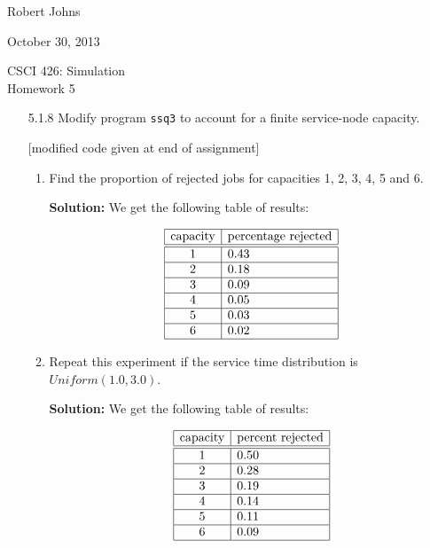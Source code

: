 \documentclass[11pt]{article} %
\begin{document}
\hfill Robert Johns

\hfill October 30, 2013

\begin{center} {\Large CSCI 426: Simulation}\\{\large Homework 5}\end{center}

\begin{enumerate}

\item[5.1.8] Modify program \texttt{ssq3} to account for a finite service-node capacity.

[modified code given at end of assignment]

\begin{enumerate}

\item Find the proportion of rejected jobs for capacities 1, 2, 3, 4, 5 and 6.  

{\bf Solution:} We get the following table of results:

$$\begin{array}{|c|l|}\hline
\textrm{capacity} & \textrm{percentage rejected}\\\hline\hline
   1 & 0.43\\\hline
   2 & 0.18\\\hline
   3 & 0.09\\\hline
   4 & 0.05\\\hline
   5 & 0.03\\\hline
   6 & 0.02\\\hline
\end{array}$$

\item Repeat this experiment if the service time distribution is $Uniform(1.0, 3.0)$.

{\bf Solution:} We get the following table of results:

$$\begin{array}{|c|l|}\hline
\textrm{capacity} & \textrm{percent rejected}\\\hline\hline
   1 & 0.50\\\hline
   2 & 0.28\\\hline
   3 & 0.19\\\hline
   4 & 0.14\\\hline
   5 & 0.11\\\hline
   6 & 0.09\\\hline
\end{array}$$


\end{enumerate}
\end{enumerate}
\end{document}
